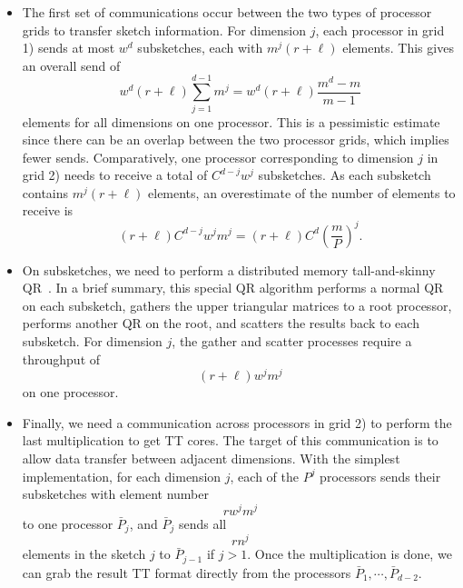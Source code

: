 \documentclass[11pt,a4paper,review]{siamart220329}
\begin{document}
\begin{itemize}[leftmargin=*,noitemsep]
\item The first set of communications occur between the two types of processor grids to transfer sketch information. For dimension $j$, each processor in grid 1) sends at most $w^d$ subsketches, each with $m^j(r+\ell)$ elements. This gives an overall send of
\begin{equation} \label{eq:sendsketch}
w^d(r+\ell)\sum_{j=1}^{d-1}m^j = w^d(r+\ell)\frac{m^d-m}{m-1}
\end{equation}
elements for all dimensions on one processor. This is a pessimistic estimate since there can be an overlap between the two processor grids, which implies fewer sends. Comparatively, one processor corresponding to dimension $j$ in grid 2) needs to receive a total of $C^{d-j}w^j$ subsketches. As each subsketch contains $m^j(r+\ell)$ elements, an overestimate of the number of elements to receive is
\begin{equation} \label{eq:recvsketch}
(r+\ell)C^{d-j}w^jm^j = (r+\ell)C^d\left(\frac{m}{P}\right)^j.
\end{equation}

\item On subsketches, we need to perform a distributed memory tall-and-skinny QR~\cite{benson2013direct}. In a brief summary, this special QR algorithm performs a normal QR on each subsketch, gathers the upper triangular matrices to a root processor, performs another QR on the root, and scatters the results back to each subsketch. For dimension $j$, the gather and scatter processes require a throughput of
\begin{equation} \label{eq:commQR}
(r+\ell) w^jm^j
\end{equation}
on one processor.

\item Finally, we need a communication across processors in grid 2) to perform the last multiplication to get TT cores. The target of this communication is to allow data transfer between adjacent dimensions. With the simplest implementation, for each dimension $j$, each of the $P^j$ processors sends their subsketches with element number
\begin{equation} \label{eq:sendcore1}
rw^jm^j
\end{equation}
to one processor $\bar{P}_j$, and $\bar{P}_j$ sends all
\begin{equation} \label{eq:sendcore2}
rn^j
\end{equation}
elements in the sketch $j$ to $\bar{P}_{j-1}$ if $j > 1$. Once the multiplication is done, we can grab the result TT format directly from the processors $\bar{P}_1, \cdots, \bar{P}_{d-2}$.

\end{itemize}
\end{document}

